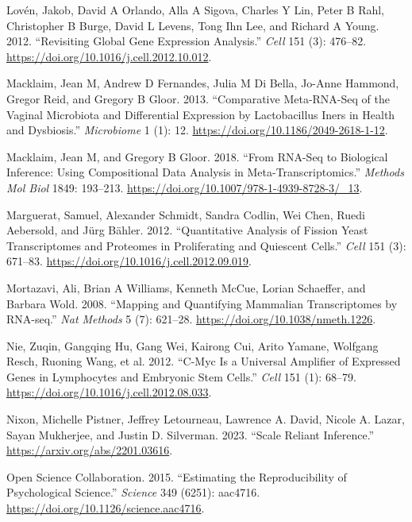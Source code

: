 \documentclass[
]{article}
\newlength{\cslhangindent}
\newlength{\cslentryspacingunit} %
\newenvironment{CSLReferences}[2] %
 {%
  \setlength{\parindent}{0pt}
  \ifodd #1
  \let\oldpar\par
  \def\par{\hangindent=\cslhangindent\oldpar}
  \fi
  \setlength{\parskip}{#2\cslentryspacingunit}
 }%
 {}
\begin{document}
\begin{CSLReferences}{1}{0}
\leavevmode{}%
Lovén, Jakob, David A Orlando, Alla A Sigova, Charles Y Lin, Peter B
Rahl, Christopher B Burge, David L Levens, Tong Ihn Lee, and Richard A
Young. 2012. {``Revisiting Global Gene Expression Analysis.''}
\emph{Cell} 151 (3): 476--82.
\url{https://doi.org/10.1016/j.cell.2012.10.012}.

\leavevmode{}%
Macklaim, Jean M, Andrew D Fernandes, Julia M Di Bella, Jo-Anne Hammond,
Gregor Reid, and Gregory B Gloor. 2013. {``Comparative Meta-{RNA}-Seq of
the Vaginal Microbiota and Differential Expression by Lactobacillus
Iners in Health and Dysbiosis.''} \emph{Microbiome} 1 (1): 12.
\url{https://doi.org/10.1186/2049-2618-1-12}.

\leavevmode{}%
Macklaim, Jean M, and Gregory B Gloor. 2018. {``From {RNA}-Seq to
Biological Inference: Using Compositional Data Analysis in
Meta-Transcriptomics.''} \emph{Methods Mol Biol} 1849: 193--213.
\url{https://doi.org/10.1007/978-1-4939-8728-3/_13}.

\leavevmode{}%
Marguerat, Samuel, Alexander Schmidt, Sandra Codlin, Wei Chen, Ruedi
Aebersold, and Jürg Bähler. 2012. {``Quantitative Analysis of Fission
Yeast Transcriptomes and Proteomes in Proliferating and Quiescent
Cells.''} \emph{Cell} 151 (3): 671--83.
\url{https://doi.org/10.1016/j.cell.2012.09.019}.

\leavevmode{}%
Mortazavi, Ali, Brian A Williams, Kenneth McCue, Lorian Schaeffer, and
Barbara Wold. 2008. {``Mapping and Quantifying Mammalian Transcriptomes
by {RNA-seq}.''} \emph{Nat Methods} 5 (7): 621--28.
\url{https://doi.org/10.1038/nmeth.1226}.

\leavevmode{}%
Nie, Zuqin, Gangqing Hu, Gang Wei, Kairong Cui, Arito Yamane, Wolfgang
Resch, Ruoning Wang, et al. 2012. {``C-{M}yc Is a Universal Amplifier of
Expressed Genes in Lymphocytes and Embryonic Stem Cells.''} \emph{Cell}
151 (1): 68--79. \url{https://doi.org/10.1016/j.cell.2012.08.033}.

\leavevmode{}%
Nixon, Michelle Pistner, Jeffrey Letourneau, Lawrence A. David, Nicole
A. Lazar, Sayan Mukherjee, and Justin D. Silverman. 2023. {``Scale
Reliant Inference.''} \url{https://arxiv.org/abs/2201.03616}.

\leavevmode{}%
Open Science Collaboration. 2015. {``Estimating the Reproducibility of
Psychological Science.''} \emph{Science} 349 (6251): aac4716.
\url{https://doi.org/10.1126/science.aac4716}.


\end{CSLReferences}
\end{document}
